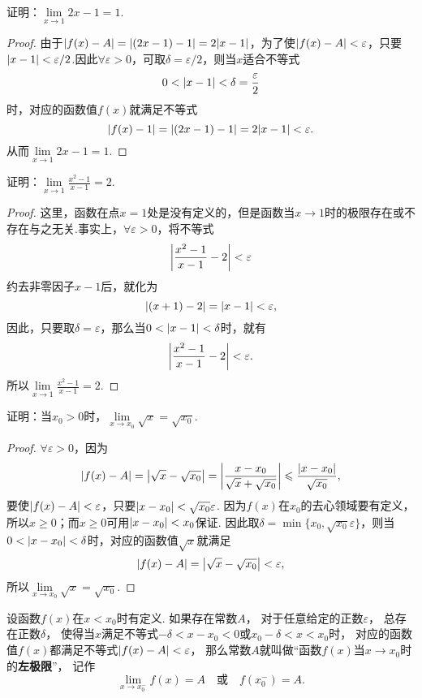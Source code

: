 \begin{example}
证明：\(\lim\limits_{x\to1} 2x-1 = 1\).
\begin{proof}
由于\(\abs{f(x) - A} = \abs{(2x-1) - 1} = 2\abs{x-1}\)，为了使\(\abs{f(x) - A} < \varepsilon\)，只要\(\abs{x-1}<\varepsilon/2\).因此\(\forall \varepsilon > 0\)，可取\(\delta = \varepsilon/2\)，则当\(x\)适合不等式\[
0 < \abs{x-1} < \delta = \frac{\varepsilon}{2}
\]时，对应的函数值\(f(x)\)就满足不等式\[
\abs{f(x) - 1} = \abs{(2x-1) - 1} = 2\abs{x-1} < \varepsilon.
\]从而\(\lim\limits_{x\to1} 2x-1 = 1\).
\end{proof}
\end{example}

\begin{example}
证明：\(\lim\limits_{x\to1} \frac{x^2-1}{x-1} = 2\).
\begin{proof}
这里，函数在点\(x=1\)处是没有定义的，但是函数当\(x\to1\)时的极限存在或不存在与之无关.事实上，\(\forall \varepsilon > 0\)，将不等式\[
\abs{\frac{x^2-1}{x-1} - 2} < \varepsilon
\]约去非零因子\(x-1\)后，就化为\[
\abs{(x+1)-2} = \abs{x-1} < \varepsilon,
\]因此，只要取\(\delta = \varepsilon\)，那么当\(0 < \abs{x-1} < \delta\)时，就有\[
\abs{\frac{x^2-1}{x-1} - 2} < \varepsilon.
\]所以\(\lim\limits_{x\to1} \frac{x^2-1}{x-1} = 2\).
\end{proof}
\end{example}

\begin{example}
证明：当\(x_0 > 0\)时，\(\lim\limits_{x \to x_0}\sqrt{x} = \sqrt{x_0}\).
\begin{proof}
\(\forall \varepsilon > 0\)，因为\[
\abs{f(x) - A} = \abs{\sqrt{x} - \sqrt{x_0}}
= \abs{\frac{x - x_0}{\sqrt{x} + \sqrt{x_0}}}
\leqslant \frac{\abs{x - x_0}}{\sqrt{x_0}},
\]要使\(\abs{f(x) - A} < \varepsilon\)，只要\(\abs{x - x_0} < \sqrt{x_0} \varepsilon\).
因为\(f(x)\)在\(x_0\)的去心领域要有定义，所以\(x \geqslant 0\)；而\(x \geqslant 0\)可用\(\abs{x - x_0} < x_0\)保证.
因此取\(\delta = \min\{x_0,\sqrt{x_0} \varepsilon\}\)，则当\(0 < \abs{x - x_0} < \delta\)时，对应的函数值\(\sqrt{x}\)就满足\[
\abs{f(x) - A} = \abs{\sqrt{x} - \sqrt{x_0}} < \varepsilon,
\]所以\(\lim\limits_{x \to x_0}\sqrt{x} = \sqrt{x_0}\).
\end{proof}
\end{example}

\begin{definition}\label{definition:极限.函数极限的定义2}
设函数\(f(x)\)在\(x < x_0\)时有定义.
如果存在常数\(A\)，%
对于任意给定的正数\(\varepsilon\)，%
总存在正数\(\delta\)，%
使得当\(x\)满足不等式\(-\delta < x - x_0 < 0\)或\(x_0 - \delta < x < x_0\)时，%
对应的函数值\(f(x)\)都满足不等式\(\abs{f(x) - A} < \varepsilon\)，%
那么常数\(A\)就叫做“函数\(f(x)\)当\(x \to x_0\)时的\textbf{左极限}”，%
记作\[
\lim\limits_{x \to x_0^-} f(x) = A
\quad\text{或}\quad
f(x_0^-) = A.
\]
\end{definition}

